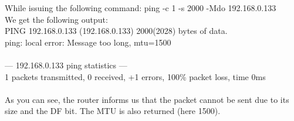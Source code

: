 While issuing the following command: ping -c 1 -s 2000 -Mdo 192.168.0.133 \\
We get the following output: \\
PING 192.168.0.133 (192.168.0.133) 2000(2028) bytes of data. \\
ping: local error: Message too long, mtu=1500 \\
 \\
--- 192.168.0.133 ping statistics --- \\
1 packets transmitted, 0 received, +1 errors, 100\% packet loss, time 0ms \\
\\
As you can see, the router informs us that the packet cannot be sent due to its size and the DF bit. The MTU is also returned (here 1500).